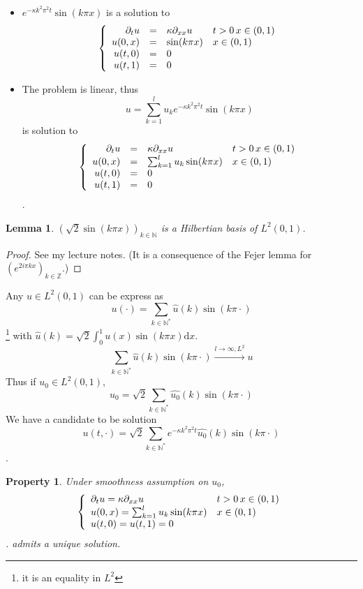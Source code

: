 \documentclass{report}
\newcommand{\N}{\ensuremath{\mathbb{N}}} %
\newcommand{\Z}{\ensuremath{\mathbb{Z}}}
\theoremstyle{plain}
\newtheorem{prop}{Property}
\newtheorem*{lem}{Lemma}
\theoremstyle{definition}
\theoremstyle{remark}
\begin{document}
\begin{itemize}
	\item $e^{-\kappa k^2\pi^2 t}\sin(k\pi x)$ is a 
		solution to 
		\begin{equation}
	\left\lbrace
	\begin{array}[]{rcll}
		\partial_t u &=& \kappa \partial_{xx} u
		& t>0 \, x\in (0,1)\\
		u(0,x) &=& \sin(k\pi x) & x\in (0,1) \\
		u(t,0) &=& 0&\\
		u(t,1) &=& 0& 
	\end{array}\right.
\end{equation}
\item  The problem is linear, thus 
	$$u = \sum_{k=1}^l u_k e^{-\kappa k^2\pi^2 t}\sin(k\pi x)$$
	is solution to 
\begin{equation}
	\left\lbrace
	\begin{array}[]{rcll}
		\partial_t u &=& \kappa \partial_{xx} u
		& t>0 \, x\in (0,1)\\
		u(0,x) &=& \sum_{k=1}^l u_k 
		\sin(k\pi x) & x\in (0,1) \\
		u(t,0) &=& 0&\\
		u(t,1) &=& 0& 
	\end{array}\right.
\end{equation}.
\end{itemize}

\begin{lem}
	$\left( \sqrt{2} \sin(k\pi x) \right)_{k\in\N}$ is a 
	Hilbertian basis of $L^2(0,1)$.
\end{lem}

\begin{proof}
	See my lecture notes.
	(It is a consequence of the Fejer lemma for
	$\left( e^{2i\pi kx}\right)_{k\in\Z}$.)
\end{proof}

Any $u\in L^2(0,1)$ can be express as 
$$u(\cdot) = \sum_{k\in\N^*} \hat{u}(k) \sin(k\pi\cdot)$$
\footnote{it is an equality in $L^2$} with
$\hat{u}(k) = \sqrt{2} \int_0^1 u(x)\sin(k\pi x) \text{d}x$.
$$\sum_{k\in\N^*} \hat{u}(k) \sin(k\pi\cdot)
\xrightarrow{l\to\infty, L^2} u$$
Thus if $u_0\in L^2(0,1)$,
$$u_0 = \sqrt{2} \sum_{k\in\N^*} \hat{u_0}(k) \sin(k\pi\cdot)$$
We have a candidate to be solution
$$u(t,\cdot) = \sqrt{2} \sum_{k\in\N^*} e^{-\kappa k^2\pi^2 t}
\hat{u_0}(k) \sin(k\pi\cdot)$$.

\begin{prop}
	Under smoothness assumption on $u_0$,
	\begin{equation}
	\left\lbrace
	\begin{array}[]{ll}
		\partial_t u = \kappa \partial_{xx} u
		& t>0 \, x\in (0,1)\\
		u(0,x) = \sum_{k=1}^l u_k 
		\sin(k\pi x) & x\in (0,1) \\
		u(t,0) = u(t,1) = 0 & 
	\end{array}\right.
\end{equation}.
admits a unique solution.
\end{prop}
\end{document}
